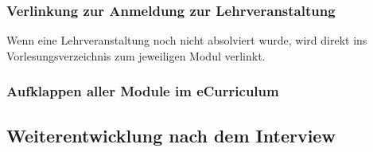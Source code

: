 \documentclass[a4paper,10pt]{scrartcl}
\begin{document}
\noindent{}
\medskip

\subsubsection*{Verlinkung zur Anmeldung zur Lehrveranstaltung}

Wenn eine Lehrveranstaltung noch nicht absolviert wurde, wird direkt ins Vorlesungsverzeichnis zum jeweiligen Modul verlinkt.

\noindent{}
\medskip

\subsubsection*{Aufklappen aller Module im eCurriculum}




\subsection{Weiterentwicklung nach dem Interview}
\end{document}
